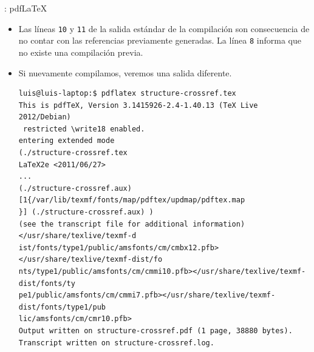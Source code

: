 \documentclass{beamer}
\begin{document}
\begin{frame}[fragile]{\insertsection: pdf\LaTeX{}}
  \begin{itemize}
  \item Las líneas \texttt{10} y \texttt{11} de la salida estándar de
    la compilación son consecuencia de no contar con las referencias
    previamente generadas. La línea \texttt{8} informa que no existe
    una compilación previa.
  \item Si nuevamente compilamos, veremos una salida diferente.
    \begin{center}
      \begin{verbatim}
luis@luis-laptop:$ pdflatex structure-crossref.tex 
This is pdfTeX, Version 3.1415926-2.4-1.40.13 (TeX Live 2012/Debian)
 restricted \write18 enabled.
entering extended mode
(./structure-crossref.tex
LaTeX2e <2011/06/27>
...
(./structure-crossref.aux) [1{/var/lib/texmf/fonts/map/pdftex/updmap/pdftex.map
}] (./structure-crossref.aux) )
(see the transcript file for additional information)</usr/share/texlive/texmf-d
ist/fonts/type1/public/amsfonts/cm/cmbx12.pfb></usr/share/texlive/texmf-dist/fo
nts/type1/public/amsfonts/cm/cmmi10.pfb></usr/share/texlive/texmf-dist/fonts/ty
pe1/public/amsfonts/cm/cmmi7.pfb></usr/share/texlive/texmf-dist/fonts/type1/pub
lic/amsfonts/cm/cmr10.pfb>
Output written on structure-crossref.pdf (1 page, 38880 bytes).
Transcript written on structure-crossref.log.
      \end{verbatim}
    \end{center}
  \end{itemize}
\end{frame}
\end{document}
